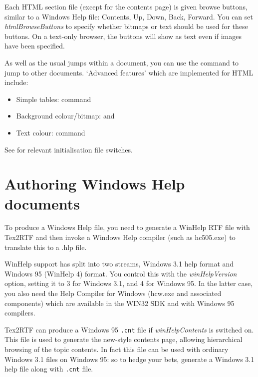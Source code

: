Each HTML section file (except for the contents page) is given browse
buttons, similar to a Windows Help file: Contents, Up, Down, Back, Forward.
You can set {\it htmlBrowseButtons} to specify whether bitmaps or text should
be used for these buttons. On a text-only browser, the buttons will show
as text even if images have been specified.

As well as the usual jumps within a document, you can use the  command to jump
to other documents. `Advanced features' which are implemented for HTML include:

\begin{itemize}\itemsep=0pt
\item Simple tables:  command
\item Background colour/bitmap:  and
\rtfsp{}
\item Text colour:  command
\end{itemize}

See  for relevant initialisation file
switches.

\section{Authoring Windows Help documents}%

To produce a Windows Help file, you need to generate a WinHelp RTF file
with Tex2RTF and then invoke a Windows Help compiler (such as hc505.exe)
to translate this to a .hlp file.

WinHelp support has split into two streams, Windows 3.1 help format
and Windows 95 (WinHelp 4) format. You control this with the {\it winHelpVersion} option,
setting it to 3 for Windows 3.1, and 4 for Windows 95. In the latter case,
you also need the Help Compiler for Windows (hcw.exe and associated components)
which are available in the WIN32 SDK and with Windows 95 compilers.

Tex2RTF can produce a Windows 95 {\tt .cnt} file if {\it winHelpContents} is switched
on. This file is used to generate the new-style contents page, allowing
hierarchical browsing of the topic contents. In fact this file can be used
with ordinary Windows 3.1 files on Windows 95: so to hedge your bets,
generate a Windows 3.1 help file along with {\tt .cnt} file.

